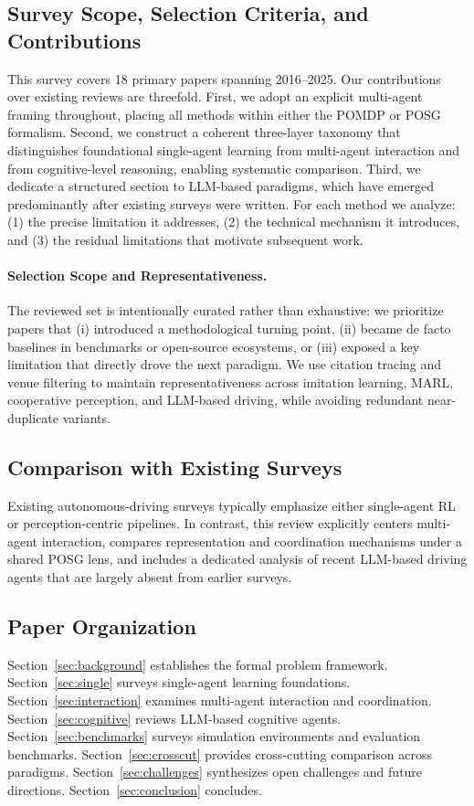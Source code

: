 \documentclass[12pt, a4paper]{article}
\begin{document}
\subsection{Survey Scope, Selection Criteria, and Contributions}
This survey covers 18 primary papers spanning 2016--2025. Our contributions over
existing reviews \citep{kiran2021deep} are threefold. First, we adopt an explicit
multi-agent framing throughout, placing all methods within either the POMDP or
POSG formalism. Second, we construct a coherent three-layer taxonomy that
distinguishes foundational single-agent learning from multi-agent interaction and
from cognitive-level reasoning, enabling systematic comparison. Third, we dedicate
a structured section to LLM-based paradigms, which have emerged predominantly
after existing surveys were written. For each method we analyze: (1) the precise
limitation it addresses, (2) the technical mechanism it introduces, and (3) the
residual limitations that motivate subsequent work.

\paragraph{Selection Scope and Representativeness.}
The reviewed set is intentionally curated rather than exhaustive: we prioritize
papers that (i) introduced a methodological turning point, (ii) became de facto
baselines in benchmarks or open-source ecosystems, or (iii) exposed a key
limitation that directly drove the next paradigm. We use citation tracing and
venue filtering to maintain representativeness across imitation learning, MARL,
cooperative perception, and LLM-based driving, while avoiding redundant
near-duplicate variants.

\subsection{Comparison with Existing Surveys}
Existing autonomous-driving surveys \citep{kiran2021deep} typically emphasize
either single-agent RL or perception-centric pipelines. In contrast, this
review explicitly centers multi-agent interaction, compares representation and
coordination mechanisms under a shared POSG lens, and includes a dedicated
analysis of recent LLM-based driving agents that are largely absent from
earlier surveys.

\subsection{Paper Organization}
Section~\ref{sec:background} establishes the formal problem framework.
Section~\ref{sec:single} surveys single-agent learning foundations.
Section~\ref{sec:interaction} examines multi-agent interaction and coordination.
Section~\ref{sec:cognitive} reviews LLM-based cognitive agents.
Section~\ref{sec:benchmarks} surveys simulation environments and evaluation
benchmarks. Section~\ref{sec:crosscut} provides cross-cutting comparison across
paradigms.
Section~\ref{sec:challenges} synthesizes open challenges and future directions.
Section~\ref{sec:conclusion} concludes.
\end{document}

